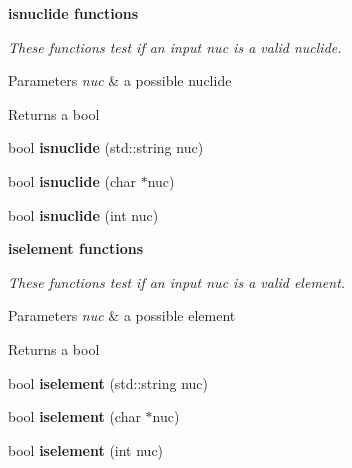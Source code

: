 \begin{Indent}{\bf isnuclide functions}\par
{\em These functions test if an input {\itshape nuc} is a valid nuclide. 
\begin{DoxyParams}{Parameters}
{\em nuc} & a possible nuclide \\
\hline
\end{DoxyParams}
\begin{DoxyReturn}{Returns}
a bool 
\end{DoxyReturn}
}\begin{DoxyCompactItemize}
\item 
\hypertarget{namespacepyne_1_1nucname_a98523777b3d9e835b929bb9e49986312}{bool {\bfseries isnuclide} (std\-::string nuc)}\label{namespacepyne_1_1nucname_a98523777b3d9e835b929bb9e49986312}

\item 
\hypertarget{namespacepyne_1_1nucname_a8c10e17441e560982994f31011c888a4}{bool {\bfseries isnuclide} (char $\ast$nuc)}\label{namespacepyne_1_1nucname_a8c10e17441e560982994f31011c888a4}

\item 
\hypertarget{namespacepyne_1_1nucname_a78423ab514ba698a3e86d808423f364b}{bool {\bfseries isnuclide} (int nuc)}\label{namespacepyne_1_1nucname_a78423ab514ba698a3e86d808423f364b}

\end{DoxyCompactItemize}
\end{Indent}
\begin{Indent}{\bf iselement functions}\par
{\em These functions test if an input {\itshape nuc} is a valid element. 
\begin{DoxyParams}{Parameters}
{\em nuc} & a possible element \\
\hline
\end{DoxyParams}
\begin{DoxyReturn}{Returns}
a bool 
\end{DoxyReturn}
}\begin{DoxyCompactItemize}
\item 
\hypertarget{namespacepyne_1_1nucname_a9e11edcac3e156039532a2806436dc27}{bool {\bfseries iselement} (std\-::string nuc)}\label{namespacepyne_1_1nucname_a9e11edcac3e156039532a2806436dc27}

\item 
\hypertarget{namespacepyne_1_1nucname_aa032e936f90e8505ce246e6429b5d394}{bool {\bfseries iselement} (char $\ast$nuc)}\label{namespacepyne_1_1nucname_aa032e936f90e8505ce246e6429b5d394}

\item 
\hypertarget{namespacepyne_1_1nucname_a2905de5d4024d9f5d287026d2e8e74f3}{bool {\bfseries iselement} (int nuc)}\label{namespacepyne_1_1nucname_a2905de5d4024d9f5d287026d2e8e74f3}

\end{DoxyCompactItemize}
\end{Indent}
